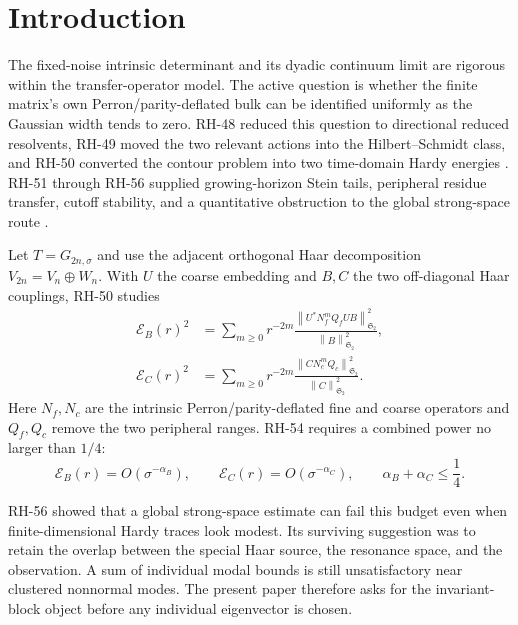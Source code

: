 \documentclass[11pt]{article}
\theoremstyle{remark}
\newcommand{\norm}[1]{\left\lVert#1\right\rVert}
\newcommand{\HS}{\mathfrak S_2}
\newcommand{\cE}{\mathcal E}
\begin{document}
\section{Introduction}

The fixed-noise intrinsic determinant and its dyadic continuum limit are
rigorous within the transfer-operator model.  The active question is whether
the finite matrix's own Perron/parity-deflated bulk can be identified
uniformly as the Gaussian width tends to zero.  RH-48 reduced this question to
directional reduced resolvents, RH-49 moved the two relevant actions into the
Hilbert--Schmidt class, and RH-50 converted the contour problem into two
time-domain Hardy energies \citep{WangIntrinsic2026,WangDirectional2026,
WangHardy2026}.  RH-51 through RH-56 supplied growing-horizon Stein tails,
peripheral residue transfer, cutoff stability, and a quantitative obstruction
to the global strong-space route \citep{WangStructuredStein2026,
WangFactorTransfer2026,WangHardyTail2026,WangFactorAware2026,
WangRieszCutoff2026,WangHardyBarrier2026}.

Let $T=G_{2n,\sigma}$ and use the adjacent orthogonal Haar decomposition
$V_{2n}=V_n\oplus W_n$.  With $U$ the coarse embedding and $B,C$ the two
off-diagonal Haar couplings, RH-50 studies
\begin{align}
 \cE_B(r)^2
 &=\sum_{m\ge0}r^{-2m}
 \frac{\norm{U^*N_f^mQ_fUB}_{\HS}^2}{\norm B_{\HS}^2},
 \label{eq:left-energy}\\
 \cE_C(r)^2
 &=\sum_{m\ge0}r^{-2m}
 \frac{\norm{CN_c^mQ_c}_{\HS}^2}{\norm C_{\HS}^2}.
 \label{eq:right-energy}
\end{align}
Here $N_f,N_c$ are the intrinsic Perron/parity-deflated fine and coarse
operators and $Q_f,Q_c$ remove the two peripheral ranges.  RH-54 requires a
combined power no larger than $1/4$:
\begin{equation}
 \cE_B(r)=O(\sigma^{-\alpha_B}),\qquad
 \cE_C(r)=O(\sigma^{-\alpha_C}),\qquad
 \alpha_B+\alpha_C\le\frac14.
 \label{eq:budget}
\end{equation}

RH-56 showed that a global strong-space estimate can fail this budget even
when finite-dimensional Hardy traces look modest.  Its surviving suggestion
was to retain the overlap between the special Haar source, the resonance
space, and the observation.  A sum of individual modal bounds is still
unsatisfactory near clustered nonnormal modes.  The present paper therefore
asks for the invariant-block object before any individual eigenvector is
chosen.
\end{document}
